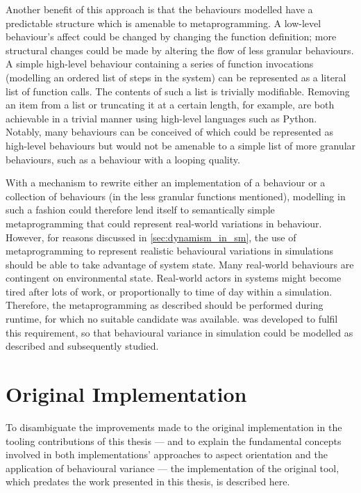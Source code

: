 Another benefit of this approach is that the behaviours modelled have a
predictable structure which is amenable to metaprogramming. A low-level
behaviour's affect could be changed by changing the function definition; more
structural changes could be made by altering the flow of less granular
behaviours. A simple high-level behaviour containing a series of function
invocations (modelling an ordered list of steps in the \sociotechnical system)
can be represented as a literal list of function calls. The contents of such a
list is trivially modifiable. Removing an item from a list or truncating it at a
certain length, for example, are both achievable in a trivial manner using
high-level languages such as Python. Notably, many behaviours can be conceived
of which could be represented as high-level behaviours but would not be amenable
to a simple list of more granular behaviours, such as a behaviour with a looping
quality. 

With a mechanism to rewrite either an implementation of a behaviour or a
collection of behaviours (in the less granular functions mentioned), modelling
in such a fashion could therefore lend itself to semantically simple
metaprogramming that could represent real-world variations in behaviour.
However, for reasons discussed in \cref{sec:dynamism_in_sm},
the use of metaprogramming to represent realistic behavioural variations in
\sociotechnical simulations should be able to take advantage of system state.
Many real-world behaviours are contingent on environmental state. Real-world
actors in \sociotechnical systems might become tired after lots of work, or
proportionally to time of day within a simulation. Therefore, the
metaprogramming as described should be performed during runtime, for which no
suitable candidate was available. \pdsf{} was developed to fulfil this
requirement, so that behavioural variance in \sociotechnical simulation could be
modelled as described and subsequently studied.



\section{Original \pdsf Implementation}\label{sec:prior_work_pdsf}


To disambiguate the improvements made to the original \pdsf implementation
in the tooling contributions of this thesis --- and to explain the fundamental
concepts involved in both implementations' approaches to aspect orientation and
the application of behavioural variance --- the implementation of the original
\pdsf tool, which predates the work presented in this thesis, is described here.



